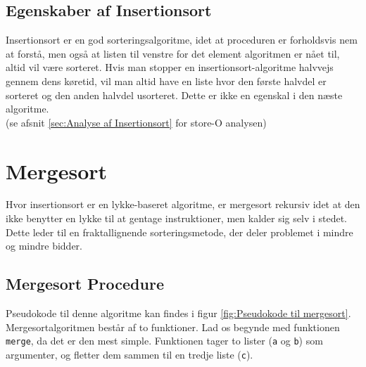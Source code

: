 \subsection{Egenskaber af Insertionsort}%
\label{sub:Egenskaber af Insertionsort}
Insertionsort er en god sorteringsalgoritme, idet at proceduren er forholdsvis nem at forstå, men også at listen til venstre for det element algoritmen er nået til, altid vil være sorteret. Hvis man stopper en insertionsort-algoritme halvvejs gennem dens køretid, vil man altid have en liste hvor den første halvdel er sorteret og den anden halvdel usorteret. Dette er ikke en egenskal i den næste algoritme.\\

(se afsnit \ref{sec:Analyse af Insertionsort} for store-O analysen)



\section{Mergesort}
\label{sec:Mergesort}

Hvor insertionsort er en lykke-baseret algoritme, er mergesort rekursiv idet at den ikke benytter en lykke til at gentage instruktioner, men kalder sig selv i stedet. Dette leder til en fraktallignende sorteringsmetode, der deler problemet i mindre og mindre bidder. 

\subsection{Mergesort Procedure}%
\label{sub:Mergesort Procedure}

Pseudokode til denne algoritme kan findes i figur \ref{fig:Pseudokode til mergesort}.\\

Mergesortalgoritmen består af to funktioner. Lad os begynde med funktionen \verb|merge|, da det er den mest simple. Funktionen tager to lister (\verb|a| og \verb|b|) som argumenter, og fletter dem sammen til en tredje liste (\verb|c|).

